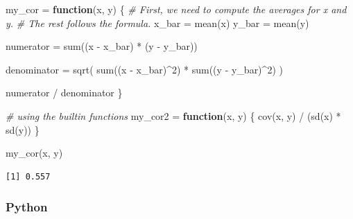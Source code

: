 \documentclass[
  letterpaper,
]{krantz}
\newenvironment{Shaded}{}{}
\newcommand{\CommentTok}[1]{\textcolor[rgb]{0.38,0.63,0.69}{\textit{#1}}}
\newcommand{\ControlFlowTok}[1]{\textcolor[rgb]{0.00,0.44,0.13}{\textbf{#1}}}
\newcommand{\DecValTok}[1]{\textcolor[rgb]{0.25,0.63,0.44}{#1}}
\newcommand{\FunctionTok}[1]{\textcolor[rgb]{0.02,0.16,0.49}{#1}}
\newcommand{\NormalTok}[1]{#1}
\newcommand{\OtherTok}[1]{\textcolor[rgb]{0.00,0.44,0.13}{#1}}
\newcommand{\SpecialCharTok}[1]{\textcolor[rgb]{0.25,0.44,0.63}{#1}}
\begin{document}
\begin{Shaded}
\begin{Highlighting}[]
\NormalTok{my\_cor }\OtherTok{=} \ControlFlowTok{function}\NormalTok{(x, y) \{}
    \CommentTok{\# First, we need to compute the averages for x and y.}
    \CommentTok{\# The rest follows the formula.}
\NormalTok{    x\_bar }\OtherTok{=} \FunctionTok{mean}\NormalTok{(x)}
\NormalTok{    y\_bar }\OtherTok{=} \FunctionTok{mean}\NormalTok{(y)}

\NormalTok{    numerator }\OtherTok{=} \FunctionTok{sum}\NormalTok{((x }\SpecialCharTok{{-}}\NormalTok{ x\_bar) }\SpecialCharTok{*}\NormalTok{ (y }\SpecialCharTok{{-}}\NormalTok{ y\_bar))}

\NormalTok{    denominator }\OtherTok{=} \FunctionTok{sqrt}\NormalTok{(}
        \FunctionTok{sum}\NormalTok{((x }\SpecialCharTok{{-}}\NormalTok{ x\_bar)}\SpecialCharTok{\^{}}\DecValTok{2}\NormalTok{) }\SpecialCharTok{*} \FunctionTok{sum}\NormalTok{((y }\SpecialCharTok{{-}}\NormalTok{ y\_bar)}\SpecialCharTok{\^{}}\DecValTok{2}\NormalTok{)}
\NormalTok{    )}

\NormalTok{    numerator }\SpecialCharTok{/}\NormalTok{ denominator}
\NormalTok{\}}

\CommentTok{\# using the builtin functions}
\NormalTok{my\_cor2 }\OtherTok{=} \ControlFlowTok{function}\NormalTok{(x, y) \{}
    \FunctionTok{cov}\NormalTok{(x, y) }\SpecialCharTok{/}\NormalTok{ (}\FunctionTok{sd}\NormalTok{(x) }\SpecialCharTok{*} \FunctionTok{sd}\NormalTok{(y))}
\NormalTok{\}}

\FunctionTok{my\_cor}\NormalTok{(x, y)}
\end{Highlighting}
\end{Shaded}

\begin{verbatim}
[1] 0.557
\end{verbatim}

\subsubsection{Python}
\end{document}
